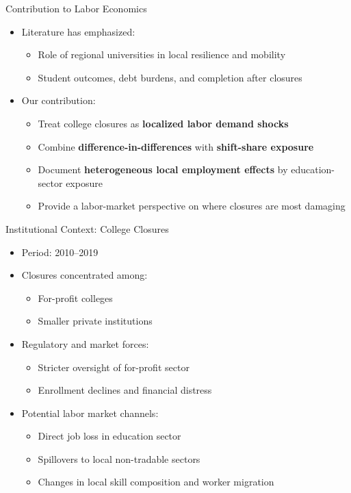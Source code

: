 \documentclass[aspectratio=169]{beamer}
\begin{document}
\begin{frame}{Contribution to Labor Economics}
  \begin{itemize}
    \item Literature has emphasized:
      \begin{itemize}
        \item Role of regional universities in local resilience and mobility
        \item Student outcomes, debt burdens, and completion after closures
      \end{itemize}
    \item Our contribution:
      \begin{itemize}
        \item Treat college closures as \textbf{localized labor demand shocks}
        \item Combine \textbf{difference-in-differences} with \textbf{shift-share exposure}
        \item Document \textbf{heterogeneous local employment effects} by education-sector exposure
        \item Provide a labor-market perspective on where closures are most damaging
      \end{itemize}
  \end{itemize}
\end{frame}

\begin{frame}{Institutional Context: College Closures}
  \begin{itemize}
    \item Period: 2010--2019
    \item Closures concentrated among:
      \begin{itemize}
        \item For-profit colleges
        \item Smaller private institutions
      \end{itemize}
    \item Regulatory and market forces:
      \begin{itemize}
        \item Stricter oversight of for-profit sector
        \item Enrollment declines and financial distress
      \end{itemize}
    \item Potential labor market channels:
      \begin{itemize}
        \item Direct job loss in education sector
        \item Spillovers to local non-tradable sectors
        \item Changes in local skill composition and worker migration
      \end{itemize}
  \end{itemize}
\end{frame}
\end{document}
